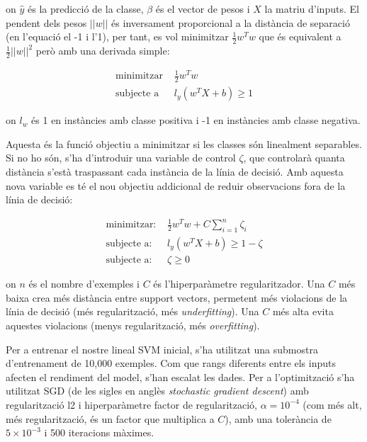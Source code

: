\documentclass[12pt, spanish]{article}
\begin{document}
on $\hat{y}$ és la predicció de la classe, $\beta$ és el vector de pesos i $X$ la matriu d'inputs. El pendent dels pesos $||w||$ és inversament proporcional a la distància de separació (en l'equació el -1 i l'1), per tant, es vol minimitzar $ \frac{1}{2} w^T w$ que és equivalent a $ \frac{1}{2}||w||^2$ però amb una derivada simple:


\begin{equation} 
\begin{split}
\text{minimitzar } & \frac{1}{2} w^T w \\
\text{subjecte a }&  l_y (w^T X + b) \ge 1
\end{split}
\end{equation}

on $l_w$ és 1 en instàncies amb classe positiva i -1 en instàncies amb classe negativa.

Aquesta és la funció objectiu a minimitzar si les classes són linealment separables. Si no ho són, s'ha d'introduir una variable de control $\zeta$, que controlarà quanta distància s'està traspassant cada instància de la línia de decisió. Amb aquesta nova variable es té el nou objectiu addicional de reduir observacions fora de la línia de decisió:

\begin{equation} 
\begin{split}
\text{minimitzar: } & \frac{1}{2} w^T w + C \sum^n_{i = 1} \zeta_i \\
\text{subjecte a: }&  l_y (w^T X + b) \ge 1 - \zeta \\
\text{subjecte a: }& \zeta \ge 0
\end{split}
\end{equation}

on $n$ és el nombre d'exemples i $C$ és l'hiperparàmetre regularitzador. Una $C$ més baixa crea més distància entre support vectors, permetent més violacions de la línia de decisió (més regularització, més \textit{underfitting}). Una $C$ més alta evita aquestes violacions (menys regularització, més \textit{overfitting}). 

Per a entrenar el nostre lineal SVM inicial, s'ha utilitzat una submostra d'entrenament de 10,000 exemples. Com que rangs diferents entre els inputs afecten el rendiment del model, s'han escalat les dades. Per a l'optimització s'ha utilitzat SGD (de les sigles en anglès \textit{stochastic gradient descent}) amb regularització l2 i hiperparàmetre factor de regularització, $\alpha = 10^{-4}$ (com més alt, més regularització, és un factor que multiplica a $C$), amb una tolerància de $5 \times 10^{-3}$ i 500 iteracions màximes.
\end{document}
